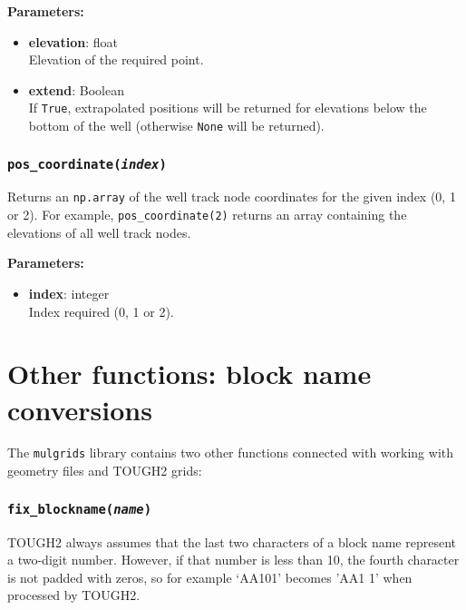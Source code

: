 \textbf{Parameters:}
\begin{itemize}
\item \textbf{elevation}: float\\
  Elevation of the required point.
\item \textbf{extend}: Boolean\\
  If \texttt{True}, extrapolated positions will be returned for elevations below the bottom of the well (otherwise \texttt{None} will be returned).
\end{itemize}

\begin{snugshade}
\subsubsection{\texttt{pos\_coordinate(\emph{index})}}
\end{snugshade}
\label{sec:well:pos_coordinate}

Returns an \texttt{np.array} of the well track node coordinates for the given index (0, 1 or 2).  For example, \texttt{pos\_coordinate(2)} returns an array containing the elevations of all well track nodes.

\textbf{Parameters:}
\begin{itemize}
\item \textbf{index}: integer\\
  Index required (0, 1 or 2).
\end{itemize}

\section{Other functions: block name conversions}

The \texttt{mulgrids} library contains two other functions connected with working with geometry files and TOUGH2 grids:

\begin{snugshade}
\subsubsection{\texttt{fix\_blockname(\emph{name})}}
\end{snugshade}
\label{sec:mulgrid:fix_blockname}

TOUGH2 always assumes that the last two characters of a block name represent a two-digit number.  However, if that number is less than 10, the fourth character is not padded with zeros, so for example `AA101' becomes 'AA1 1' when processed by TOUGH2.

